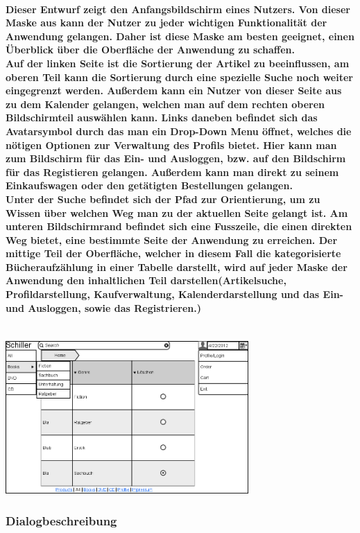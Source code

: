 \documentclass[a4paper]{article}
\begin{document}
\paragraph{Dieser Entwurf zeigt den Anfangsbildschirm eines Nutzers. Von dieser Maske aus kann der Nutzer zu jeder wichtigen Funktionalität der Anwendung gelangen. Daher ist diese Maske am besten geeignet, einen Überblick über die Oberfläche der Anwendung zu schaffen.\\
Auf der linken Seite ist die Sortierung der Artikel zu beeinflussen, am oberen Teil kann die Sortierung durch eine spezielle Suche noch weiter eingegrenzt werden. Außerdem kann ein Nutzer von dieser Seite aus zu dem Kalender gelangen, welchen man auf dem rechten oberen Bildschirmteil auswählen kann. Links daneben befindet sich das Avatarsymbol durch das man ein Drop-Down Menu öffnet, welches die nötigen Optionen zur Verwaltung des Profils bietet. Hier kann man zum Bildschirm für das Ein- und Ausloggen, bzw. auf den Bildschirm für das Registieren gelangen. Außerdem kann man direkt zu seinem Einkaufswagen oder den getätigten Bestellungen gelangen. \\
Unter der Suche befindet sich der Pfad zur Orientierung, um zu Wissen über welchen Weg man zu der aktuellen Seite gelangt ist.
Am unteren Bildschirmrand befindet sich eine Fusszeile, die einen direkten Weg bietet, eine bestimmte Seite der Anwendung zu erreichen.
Der mittige Teil der Oberfläche, welcher in diesem Fall die kategorisierte Bücheraufzählung in einer Tabelle darstellt, wird auf jeder Maske der Anwendung den inhaltlichen Teil darstellen(Artikelsuche, Profildarstellung, Kaufverwaltung, Kalenderdarstellung und das Ein- und Ausloggen, sowie das Registrieren.)\\ \\}
\includegraphics[width=350px]{1Home_Costumer.png}


\subsubsection{Dialogbeschreibung}
\end{document}
